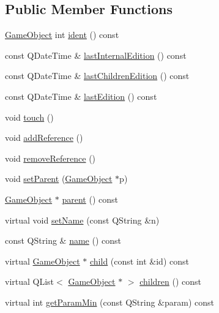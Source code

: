 \subsection*{\-Public \-Member \-Functions}
\begin{DoxyCompactItemize}
\item 
\hyperlink{class_game_object}{\-Game\-Object} int \hyperlink{class_game_object_a21515212e3deb4123268f220e142b077}{ident} () const 
\item 
const \-Q\-Date\-Time \& \hyperlink{class_game_object_a0c4cc65819b30ec36a1c20a1c24997fe}{last\-Internal\-Edition} () const 
\item 
const \-Q\-Date\-Time \& \hyperlink{class_game_object_acc65ad08191fcaf558bd1840a45d23cf}{last\-Children\-Edition} () const 
\item 
const \-Q\-Date\-Time \& \hyperlink{class_game_object_a73b351287147712a937e87028bf8c876}{last\-Edition} () const 
\item 
void \hyperlink{class_game_object_a2130d5674df041b5a7eaf987f9b1e642}{touch} ()
\item 
void \hyperlink{class_game_object_a815c7f587c0ae528614add95655d9a0a}{add\-Reference} ()
\item 
void \hyperlink{class_game_object_a68725fd75f55bc73bb44216406ce34e5}{remove\-Reference} ()
\item 
void \hyperlink{class_game_object_ae34944b23d5d7d472d5c8da3f42fb2e3}{set\-Parent} (\hyperlink{class_game_object}{\-Game\-Object} $\ast$p)
\item 
\hyperlink{class_game_object}{\-Game\-Object} $\ast$ \hyperlink{class_game_object_af3deaf39cde23c189765634e32e95bb4}{parent} () const 
\item 
virtual void \hyperlink{class_game_object_ae928d2f18b5a26656ad41b7c27b463a7}{set\-Name} (const \-Q\-String \&n)
\item 
const \-Q\-String \& \hyperlink{class_game_object_aede5e0829a5fe107b1419bd62f03c132}{name} () const 
\item 
virtual \hyperlink{class_game_object}{\-Game\-Object} $\ast$ \hyperlink{class_game_object_a97fbf0507cf140b9f3abb568c6a97145}{child} (const int \&id) const 
\item 
virtual \-Q\-List$<$ \hyperlink{class_game_object}{\-Game\-Object} $\ast$ $>$ \hyperlink{class_game_object_a3f68b64d3a0793048cfe5deab35397e0}{children} () const 
\item 
virtual int \hyperlink{class_game_object_a3a308cc3f1d11d66dd5583fb531035c3}{get\-Param\-Min} (const \-Q\-String \&param) const 

\end{DoxyCompactItemize}
